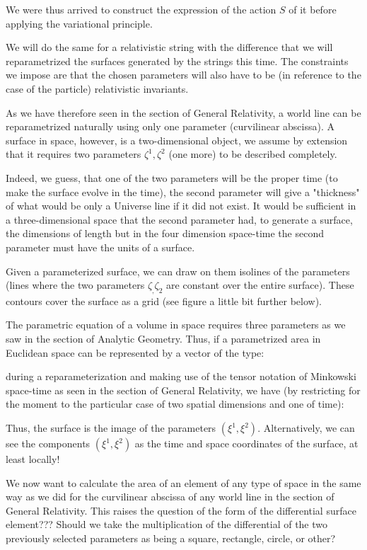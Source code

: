 	We were thus arrived to construct the expression of the action $S$ of it before applying the variational principle.
	
	We will do the same for a relativistic string with the difference that we will reparametrized the surfaces generated by the strings this time. The constraints we impose are that the chosen parameters will also have to be (in reference to the case of the particle) relativistic invariants.
	
	As we have therefore seen in the section of General Relativity, a world line can be reparametrized naturally using only one parameter (curvilinear abscissa). A surface in space, however, is a two-dimensional object, we assume by extension that it requires two parameters $\zeta^1,\zeta^2$ (one more) to be described completely.
	
	Indeed, we guess, that one of the two parameters will be the proper time (to make the surface evolve in the time), the second parameter will give a "thickness" of what would be only a Universe line if it did not exist. It would be sufficient in a three-dimensional space that the second parameter had, to generate a surface, the dimensions of length but in the four dimension space-time the second parameter must have the units of a surface.
	
	Given a parameterized surface, we can draw on them isolines of the parameters (lines where the two parameters $\zeta_,\zeta_2$ are constant over the entire surface). These contours cover the surface as a grid (see figure a little bit further below).
	
	The parametric equation of a volume in space requires three parameters as we saw in the section of Analytic Geometry. Thus, if a parametrized area in Euclidean space can be represented by a vector of the type:
	
	during a reparameterization and making use of the tensor notation of Minkowski space-time as seen in the section of General Relativity, we have (by restricting for the moment to the particular case of two spatial dimensions and one of time):
	
	Thus, the surface is the image of the parameters $(\xi^1,\xi^2)$. Alternatively, we can see the components $(\xi^1,\xi^2)$ as the time and space coordinates of the surface, at least locally!
	
	We now want to calculate the area of an element of any type of space in the same way as we did for the curvilinear abscissa of any world line in the section of General Relativity. This raises the question of the form of the differential surface element??? Should we take the multiplication of the differential of the two previously selected parameters as being a square, rectangle, circle, or other?
	
